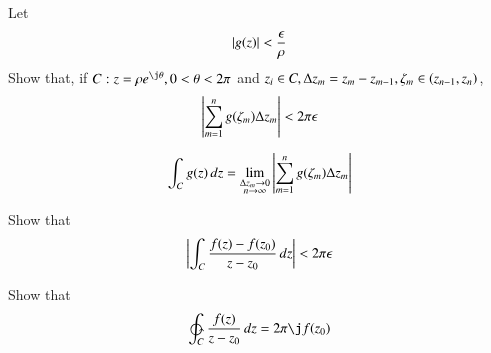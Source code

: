 \documentclass[journal,12pt,twocolumn]{IEEEtran}
\begin{document}
\begin{problem}
Let 
\begin{equation}
\left\vert g(z)\right\vert < \frac{\epsilon}{\rho}
\end{equation}
Show that, if $C:z = \rho e^{\j\theta}, 0 < \theta < 2\pi$ and $z_i \in C, \Delta z_m = z_m - z_{m-1}, \zeta_m \in \left(z_{n-1},z_{n}\right)$,
\begin{equation}
\left\vert\sum_{m=1}^{n}g(\zeta_m)\Delta z_m\right\vert < 2\pi\epsilon
\end{equation}
\end{problem}
\begin{definition}
\begin{equation}
\label{eq:line_int_def}
\int_C g(z)\,dz = \lim_{\substack{\Delta z_m \to 0 \\ n \to \infty}}\left\vert\sum_{m=1}^{n}g(\zeta_m)\Delta z_m\right\vert 
\end{equation}
\end{definition}
\begin{problem}
Show that 
\begin{equation}
\left\vert\int_C \frac{f(z)-f(z_0)}{z-z_0}\,dz\right\vert < 2\pi\epsilon
\end{equation}
%
\end{problem}
\begin{problem}
Show that
\begin{equation}
\ointctrclockwise_C \frac{f(z)}{z-z_0}\,dz =  2\pi \j f(z_0)
\end{equation}
\end{problem}
\end{document}

